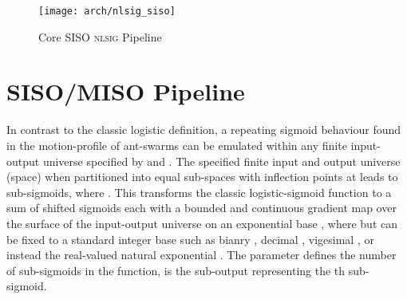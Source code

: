 \documentclass[journal]{IEEEtran}
\theoremstyle{plain}
\theoremstyle{definition}
\theoremstyle{remark}
\begin{document}
\begin{figure}[]
	\centering
	\texttt{[image: arch/nlsig\_siso]}
	\caption[Core \textsc{nlsig} Pipeline]{Core SISO \textsc{nlsig} Pipeline}
	\label{fig:nlsigsiso}
\end{figure}

\section{SISO/MISO Pipeline}\label{sec_sisodef}
In contrast to the classic logistic definition, a repeating sigmoid behaviour found in the motion-profile of ant-swarms can be emulated within any finite input-output universe specified by  and . The specified finite input and output universe (space) when partitioned into  equal sub-spaces with  inflection points at  leads to  sub-sigmoids, where . This transforms the classic logistic-sigmoid function to a sum of  shifted sigmoids each with a bounded and continuous gradient map over the surface of the input-output universe on an exponential base , where  but can be fixed to a standard integer base such as bianry , decimal , vigesimal , or instead the real-valued natural exponential . The parameter  defines the number of sub-sigmoids in the function,  is the sub-output representing the th sub-sigmoid.
\end{document}
